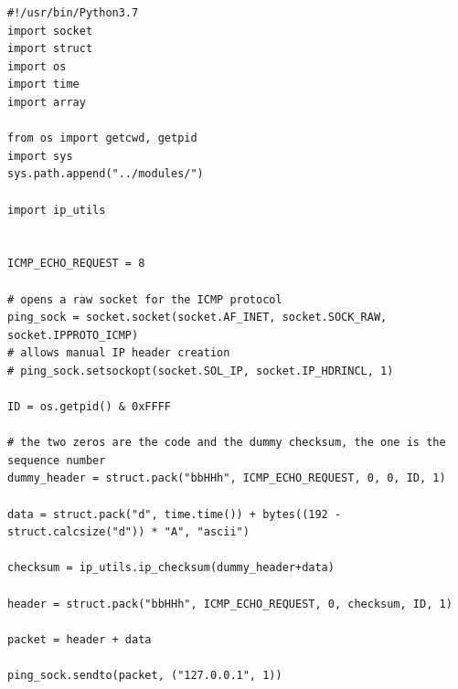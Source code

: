 \documentclass[titlepage]{article}
\begin{document}
\begin{lstlisting}[label=echosend,caption=\textit{A prototype for sending \gls{icmp} echo request packets.}]
#!/usr/bin/Python3.7
import socket
import struct
import os
import time
import array

from os import getcwd, getpid
import sys
sys.path.append("../modules/")

import ip_utils


ICMP_ECHO_REQUEST = 8

# opens a raw socket for the ICMP protocol
ping_sock = socket.socket(socket.AF_INET, socket.SOCK_RAW, socket.IPPROTO_ICMP)
# allows manual IP header creation
# ping_sock.setsockopt(socket.SOL_IP, socket.IP_HDRINCL, 1)

ID = os.getpid() & 0xFFFF

# the two zeros are the code and the dummy checksum, the one is the sequence number
dummy_header = struct.pack("bbHHh", ICMP_ECHO_REQUEST, 0, 0, ID, 1)

data = struct.pack("d", time.time()) + bytes((192 - struct.calcsize("d")) * "A", "ascii")

checksum = ip_utils.ip_checksum(dummy_header+data)

header = struct.pack("bbHHh", ICMP_ECHO_REQUEST, 0, checksum, ID, 1)

packet = header + data

ping_sock.sendto(packet, ("127.0.0.1", 1))
\end{lstlisting}

\begin{algorithm}
\begin{algorithmic}[1]
\end{algorithmic}
\caption{\textit{%
  Psuedocode for the code in Listing~\ref{echorecv}.
}}
\end{algorithm}
\end{document}
